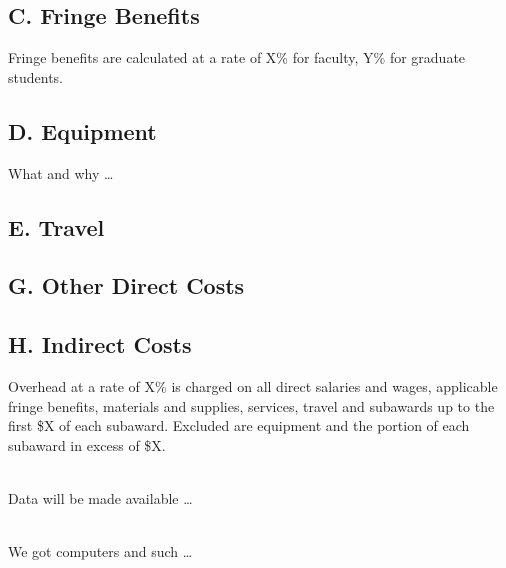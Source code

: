 \documentclass{DOEproposal}
\begin{document}
\subsection*{C. Fringe Benefits}
Fringe benefits are calculated at a rate of X\% for faculty, Y\% for graduate students.  

\subsection*{D. Equipment}
What and why \dots

\subsection*{E. Travel}
%

\subsection*{G. Other Direct Costs}

\subsection*{H. Indirect Costs}
Overhead at a rate of X\% is charged on all direct salaries and wages, applicable fringe benefits, materials and supplies, services, travel and subawards up to the first \$X of each subaward. Excluded are equipment and the portion of each subaward in excess of \$X.


\newpage
{}
\renewcommand{\thepage} {H--\arabic{page}}
\\

Data will be made available \dots



\newpage
{}
\renewcommand{\thepage} {I--\arabic{page}}
\\

We got computers and such \dots


\end{document}
